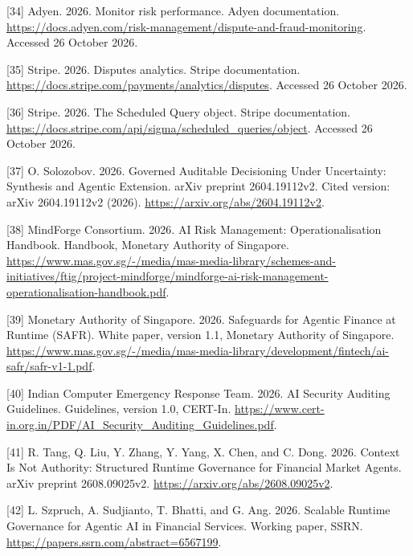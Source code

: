 \documentclass[acmlarge,review,anonymous,nonacm]{acmart}
\newlength{\cslhangindent}
\newlength{\cslentryspacingunit} %
\newenvironment{CSLReferences}[2] %
 {\bibliofont %
  \setlength{\parindent}{0pt}
  \ifodd #1
  \let\oldpar\par
  \def\par{\hangindent=\cslhangindent\oldpar}
  \fi
  \setlength{\parskip}{#2\cslentryspacingunit}
 }%
 {}
\begin{document}
\begin{CSLReferences}{1}{1}
\leavevmode{}%
{[}34{]} Adyen. 2026. Monitor risk performance. Adyen documentation.
\url{https://docs.adyen.com/risk-management/dispute-and-fraud-monitoring}.
Accessed 26 October 2026.

\leavevmode{}%
{[}35{]} Stripe. 2026. Disputes analytics. Stripe documentation.
\url{https://docs.stripe.com/payments/analytics/disputes}. Accessed 26
October 2026.

\leavevmode{}%
{[}36{]} Stripe. 2026. The Scheduled Query object. Stripe documentation.
\url{https://docs.stripe.com/api/sigma/scheduled_queries/object}.
Accessed 26 October 2026.

\leavevmode{}%
{[}37{]} O. Solozobov. 2026. Governed Auditable Decisioning Under
Uncertainty: Synthesis and Agentic Extension. arXiv preprint
2604.19112v2. Cited version: arXiv 2604.19112v2 (2026).
\url{https://arxiv.org/abs/2604.19112v2}.

\leavevmode{}%
{[}38{]} MindForge Consortium. 2026. AI Risk Management:
Operationalisation Handbook. Handbook, Monetary Authority of Singapore.
\url{https://www.mas.gov.sg/-/media/mas-media-library/schemes-and-initiatives/ftig/project-mindforge/mindforge-ai-risk-management-operationalisation-handbook.pdf}.

\leavevmode{}%
{[}39{]} Monetary Authority of Singapore. 2026. Safeguards for Agentic
Finance at Runtime (SAFR). White paper, version 1.1, Monetary Authority
of Singapore.
\url{https://www.mas.gov.sg/-/media/mas-media-library/development/fintech/ai-safr/safr-v1-1.pdf}.

\leavevmode{}%
{[}40{]} Indian Computer Emergency Response Team. 2026. AI Security
Auditing Guidelines. Guidelines, version 1.0, CERT-In.
\url{https://www.cert-in.org.in/PDF/AI_Security_Auditing_Guidelines.pdf}.

\leavevmode{}%
{[}41{]} R. Tang, Q. Liu, Y. Zhang, Y. Yang, X. Chen, and C. Dong. 2026.
Context Is Not Authority: Structured Runtime Governance for Financial
Market Agents. arXiv preprint 2608.09025v2.
\url{https://arxiv.org/abs/2608.09025v2}.

\leavevmode{}%
{[}42{]} L. Szpruch, A. Sudjianto, T. Bhatti, and G. Ang. 2026. Scalable
Runtime Governance for Agentic AI in Financial Services. Working paper,
SSRN. \url{https://papers.ssrn.com/abstract=6567199}.


\end{CSLReferences}
\end{document}
